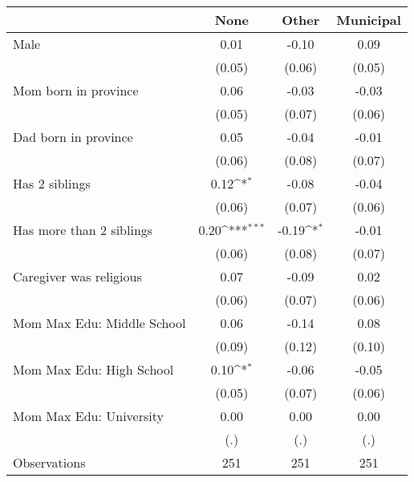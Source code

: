 {
\def\sym#1{\ifmmode^{#1}\else\(^{#1}\)\fi}
\begin{tabular}{l*{3}{c}}
\toprule
                    &\multicolumn{1}{c}{None}&\multicolumn{1}{c}{Other}&\multicolumn{1}{c}{Municipal}\\
\midrule
Male                &        0.01         &       -0.10         &        0.09         \\
                    &      (0.05)         &      (0.06)         &      (0.05)         \\
\addlinespace
Mom born in province&        0.06         &       -0.03         &       -0.03         \\
                    &      (0.05)         &      (0.07)         &      (0.06)         \\
\addlinespace
Dad born in province&        0.05         &       -0.04         &       -0.01         \\
                    &      (0.06)         &      (0.08)         &      (0.07)         \\
\addlinespace
Has 2 siblings      &        0.12\sym{*}  &       -0.08         &       -0.04         \\
                    &      (0.06)         &      (0.07)         &      (0.06)         \\
\addlinespace
Has more than 2 siblings&        0.20\sym{***}&       -0.19\sym{*}  &       -0.01         \\
                    &      (0.06)         &      (0.08)         &      (0.07)         \\
\addlinespace
Caregiver was religious&        0.07         &       -0.09         &        0.02         \\
                    &      (0.06)         &      (0.07)         &      (0.06)         \\
\addlinespace
Mom Max Edu: Middle School&        0.06         &       -0.14         &        0.08         \\
                    &      (0.09)         &      (0.12)         &      (0.10)         \\
\addlinespace
Mom Max Edu: High School&        0.10\sym{*}  &       -0.06         &       -0.05         \\
                    &      (0.05)         &      (0.07)         &      (0.06)         \\
\addlinespace
Mom Max Edu: University&        0.00         &        0.00         &        0.00         \\
                    &         (.)         &         (.)         &         (.)         \\
\midrule
Observations        &         251         &         251         &         251         \\
\bottomrule
\end{tabular}
}

